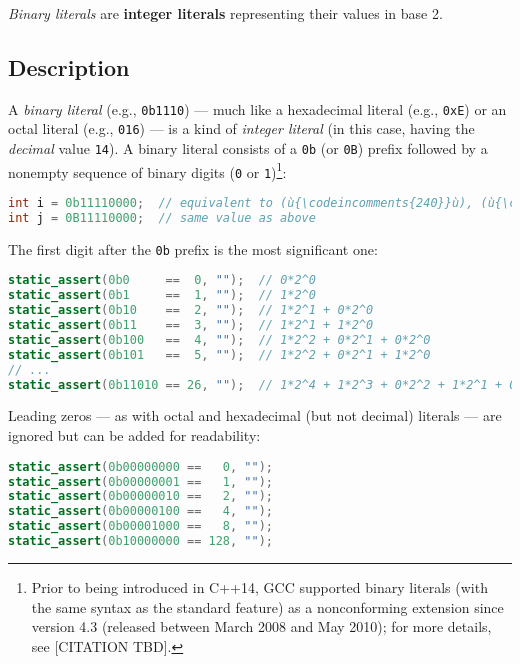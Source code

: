 

\textit{Binary literals} are \textbf{integer literals} representing their values in base 2.

\subsection[Description]{Description}\label{description}

A \emph{binary literal} (e.g., \texttt{0b1110}) --- much like a
hexadecimal literal (e.g., \texttt{0xE}) or an octal literal (e.g.,
\texttt{016}) --- is a kind of \emph{integer literal} (in this case,
having the \emph{decimal} value \texttt{14}). A binary literal consists
of a \texttt{0b} (or \texttt{0B}) prefix followed by a nonempty
sequence of binary digits (\texttt{0} or \texttt{1}){\cprotect\footnote{Prior to being introduced in C++14, GCC supported binary literals (with the same syntax as the standard feature) as a nonconforming extension since version 4.3 (released between March 2008 and
May 2010); for more details, see [CITATION TBD].}}:

\begin{lstlisting}[language=C++]
int i = 0b11110000;  // equivalent to (ù{\codeincomments{240}}ù), (ù{\codeincomments{0360}}ù), or (ù{\codeincomments{0xF0}}ù)
int j = 0B11110000;  // same value as above
\end{lstlisting}
    

\noindent The first digit after the \texttt{0b} prefix is the most significant
one:

\begin{lstlisting}[language=C++]
static_assert(0b0     ==  0, "");  // 0*2^0
static_assert(0b1     ==  1, "");  // 1*2^0
static_assert(0b10    ==  2, "");  // 1*2^1 + 0*2^0
static_assert(0b11    ==  3, "");  // 1*2^1 + 1*2^0
static_assert(0b100   ==  4, "");  // 1*2^2 + 0*2^1 + 0*2^0
static_assert(0b101   ==  5, "");  // 1*2^2 + 0*2^1 + 1*2^0
// ...
static_assert(0b11010 == 26, "");  // 1*2^4 + 1*2^3 + 0*2^2 + 1*2^1 + 0*2^0
\end{lstlisting}
    

\noindent Leading zeros --- as with octal and hexadecimal (but not decimal)
literals --- are ignored but can be added for readability:

\begin{lstlisting}[language=C++]
static_assert(0b00000000 ==   0, "");
static_assert(0b00000001 ==   1, "");
static_assert(0b00000010 ==   2, "");
static_assert(0b00000100 ==   4, "");
static_assert(0b00001000 ==   8, "");
static_assert(0b10000000 == 128, "");
\end{lstlisting}
    

